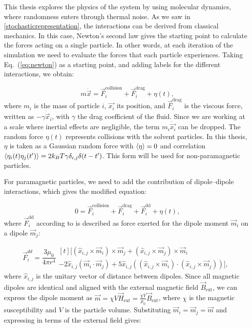 This thesis explores the physics of the system by using molecular dynamics, where randomness enters through thermal noise. As we saw in \ref{stochasticrepresentation}, the interactions can be derived from classical mechanics. In this case, Newton’s second law gives the starting point to calculate the forces acting on a single particle. In other words, at each iteration of the simulation we need to evaluate the forces that each particle experiences. Taking Eq.~(\ref{eq:newton}) as a starting point, and adding labels for the different interactions, we obtain:

\begin{equation}
  m\ddot{\vec{x}} = \vec{F}^{\mathrm{collision}}_i + \vec{F}^{\mathrm{drag}}_i + \eta(t)\text{,}
  \label{eq:langevinratchet}
\end{equation}
where $m_i$ is the mass of particle $i$, $\vec{x_i}$ its position, and $\vec{F}^{\mathrm{drag}}_i$ is the viscous force, written as $-\gamma \dot{\vec{x}}_i$, with $\gamma$ the drag coefficient of the fluid. Since we are working at a scale where inertial effects are negligible, the term $m_i\ddot{\vec{x_i}}$ can be dropped. The random force $\eta(t)$ represents collisions with the solvent particles. In this thesis, $\eta$ is taken as a Gaussian random force with $\expval{\eta} = 0$ and correlation $\expval{\eta_i(t)\eta_j(t')} = 2k_B T \gamma \delta_{i,j}\delta(t-t')$. This form will be used for non-paramagnetic particles.

For paramagnetic particles, we need to add the contribution of dipole–dipole interactions, which gives the modified equation:

\begin{equation}
  0 = \vec{F}^{\mathrm{collision}}_i + \vec{F}^{\mathrm{drag}}_i + \vec{F}^{\mathrm{dd}}_i + \eta(t)\text{,}
  \label{eq:langevindipole}
\end{equation}
where $\vec{F}^{\mathrm{dd}}_i$ according to \cite{yung1998analytic} is described as force exerted for the dipole moment $\vec{m}_i$ on a dipole $\vec{m}_j$:

\begin{equation}
  \label{eq:dipoledipoleforce}
\vec{F}^{dd}_i = \frac{3\mu_0}{4\pi r^4}
\begin{multlined}[t]
\bigl[ (\hat{x}_{i,j} \times \vec{m}_i) \times \vec{m}_j
    + (\hat{x}_{i,j} \times \vec{m}_j) \times \vec{m}_i \\
    - 2\hat{x}_{i,j}(\vec{m}_i \cdot \vec{m}_j)
    + 5\hat{x}_{i,j}((\hat{x}_{i,j} \times \vec{m}_i) \cdot (\hat{x}_{i,j} \times \vec{m}_j)) \bigr],
\end{multlined}
\end{equation}
where $\hat{x}_{i,j}$ is the unitary vector of distance between dipoles. Since all magnetic dipoles are identical and aligned with the external magnetic field $\vec{B}_{\text{ext}}$, we can express the dipole moment as $\vec{m} = \chi V \vec{H}_{\text{ext}} = \frac{\chi V}{\mu_0} \vec{B}_{\text{ext}}$, where $\chi$ is the magnetic susceptibility and $V$ is the particle volume. Substituting $\vec{m}_i = \vec{m}_j = \vec{m}$ and expressing in terms of the external field gives:

